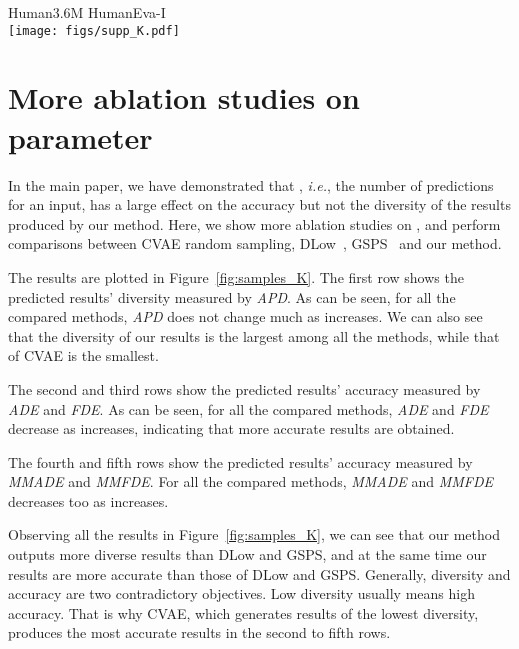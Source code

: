 \documentclass[sigconf,screen,nonacm]{acmart}
\begin{document}
	
	\begin{figure*}[!t]
		\flushleft \hspace{5.7cm} Human3.6M \hspace{4.4cm} HumanEva-I \\
		\centering
		\texttt{[image: figs/supp\_K.pdf]} \\
		\caption{The first row shows how APD of different methods (including CVAE, DLow, GSPS, and our method) varies as  increases. The other rows show the trends of ADE, FDE, MMADE, MMFDE, respectively. The figures on the left are plotted based on the data computed on Human3.6M, while those on the right are plotted based on HumanEva-I.}
		\label{fig:samples_K}
	\end{figure*}
	
	\section{More ablation studies on parameter }
	
	In the main paper, we have demonstrated that , \textit{i.e.}, the number of predictions for an input, has a large effect on the accuracy but not the diversity of the results produced by our method. Here, we show more ablation studies on , and perform comparisons between CVAE random sampling, DLow~\cite{yuan2020dlow}, GSPS~\cite{mao2021generating} and our method.
	
	The results are plotted in Figure~\ref{fig:samples_K}. The first row shows the predicted results' diversity measured by \textit{APD}. As can be seen, for all the compared methods, \textit{APD} does not change much as  increases. We can also see that the diversity of our results is the largest among all the methods, while that of CVAE is the smallest.
	
	The second and third rows show the predicted results' accuracy measured by \textit{ADE} and \textit{FDE}. As can be seen, for all the compared methods, \textit{ADE} and \textit{FDE} decrease as  increases, indicating that more accurate results are obtained. 
	
	The fourth and fifth rows show the predicted results' accuracy measured by \textit{MMADE} and \textit{MMFDE}. For all the compared methods, \textit{MMADE} and \textit{MMFDE} decreases too as  increases. 
	
	Observing all the results in Figure~\ref{fig:samples_K}, we can see that our method outputs more diverse results than DLow and GSPS, and at the same time our results are more accurate than those of DLow and GSPS. Generally, diversity and accuracy are two contradictory objectives. Low diversity usually means high accuracy. That is why CVAE, which generates results of the lowest diversity, produces the most accurate results in the second to fifth rows.
	
\end{document}
